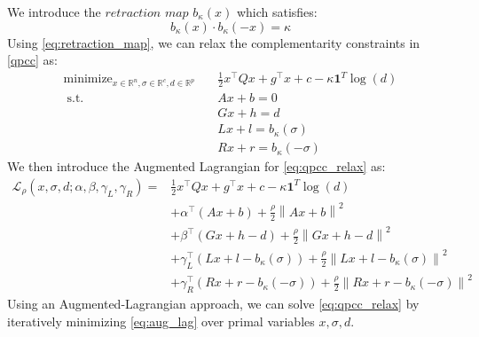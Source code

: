 \documentclass[11pt]{article}
\theoremstyle{plain}
\theoremstyle{definition}
\theoremstyle{remark}
\newcommand{\R}{\mathbb{R}}
\newcommand{\st}{\;\text{s.t.}\;}
\DeclareMathOperator*{\minimize}{minimize}
\newcommand{\norm}[1]{\left\lVert #1 \right\rVert}
\begin{document}
We introduce the $\textit{retraction map}$ $b_\kappa(x)$ which satisfies:
\begin{equation}\label{eq:retraction_map}
    b_\kappa(x) \cdot b_\kappa(-x) = \kappa
\end{equation}
Using \eqref{eq:retraction_map}, we can relax the complementarity constraints in \eqref{qpcc} as:
\begin{equation}\label{eq:qpcc_relax}
\begin{aligned}
\minimize_{x \in \R^n, \sigma\in \R^c, d \in \R^p} \quad & \frac12 x^\top Q x + g^\top x + c - \kappa\bm{1}^T \log(d) \\
\st \quad & Ax + b = 0 \\
          & Gx + h = d \\
          & Lx + l = b_\kappa(\sigma) \\
          & Rx + r = b_\kappa(-\sigma)
\end{aligned}
\end{equation}
We then introduce the Augmented Lagrangian for \eqref{eq:qpcc_relax} as:
\begin{equation}\label{eq:aug_lag}
\begin{aligned}
\mathcal{L}_\rho(x, \sigma, d; \alpha, \beta, \gamma_L, \gamma_R) = & \frac12 x^\top Q x + g^\top x + c - \kappa\bm{1}^T \log(d) \\
& + \alpha^\top (Ax + b) + \frac\rho2 \norm{Ax + b}^2 \\
& + \beta^\top (Gx + h - d) + \frac\rho2 \norm{Gx+h-d}^2 \\
& + \gamma_L^\top (Lx + l - b_\kappa(\sigma)) + \frac\rho2 \norm{Lx + l - b_\kappa(\sigma)}^2 \\
& + \gamma_R^\top (Rx + r - b_\kappa(-\sigma)) + \frac\rho2 \norm{Rx + r - b_\kappa(-\sigma)}^2
\end{aligned}
\end{equation}
Using an Augmented-Lagrangian approach, we can solve \eqref{eq:qpcc_relax} by iteratively minimizing \eqref{eq:aug_lag}
over primal variables $x, \sigma, d$.
\end{document}
